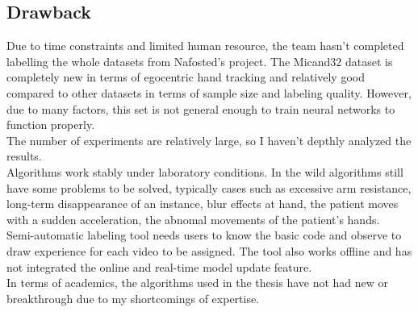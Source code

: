 \subsection{Drawback}
Due to time constraints and limited human resource, the team hasn't completed labelling the whole datasets from Nafosted's project. The Micand32 dataset is completely new in terms of egocentric hand tracking and relatively good compared to other datasets in terms of sample size and labeling quality. However, due to many factors, this set is not general enough to train neural networks to function properly.
\\The number of experiments are relatively large, so I haven’t depthly analyzed the results.
\\Algorithms work stably under laboratory conditions. In the wild algorithms still have some problems to be solved, typically cases such as excessive arm resistance, long-term disappearance of an instance, blur effects at hand, the patient moves with a sudden acceleration, the abnomal movements of the patient’s hands.
\\Semi-automatic labeling tool needs users to know the basic code and observe to draw experience for each video to be assigned. The tool also works offline and has not integrated the online and real-time model update feature.
\\In terms of academics, the algorithms used in the thesis have not had new or breakthrough due to my shortcomings of expertise.
